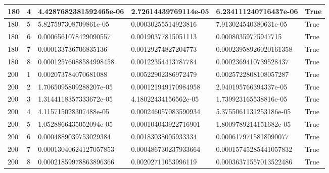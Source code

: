 \documentclass[a4paper, 12pt]{report}
\def\tabsize{4.4cm}
\def\stabsize{0.97cm}
\def\mtabsize{0.73cm}
\begin{document}
\begin{center}
\begin{longtable}{|m{\stabsize}|m{\stabsize}|m{\tabsize}|m{\tabsize}|m{\tabsize}|m{\mtabsize}|}
180 & 4 & 4.4287682381592465e-06 & 2.72614439769114e-05 & 6.234111240716437e-06 & True \\ \hline  
180 & 5 & 5.827597308709861e-05 & 0.00030255514923816 & 7.913024540380631e-05 & True \\ \hline  
180 & 6 & 0.0006561078429090557 & 0.00190377815051113 & 0.00080359775947715 & True \\ \hline  
180 & 7 & 0.000133736706835136 & 0.00129274827204773 & 0.00023958926020161358 & True \\ \hline  
180 & 8 & 0.00012576088584998458 & 0.00122354413787784 & 0.0002369410739528437 & True \\ \hline  
200 & 1 & 0.002073784070681088 & 0.00522902386972479 & 0.0025722808108057287 & True \\ \hline  
200 & 2 & 1.7065095809288207e-05 & 0.000121949170984958 & 2.940195766394337e-05 & True \\ \hline  
200 & 3 & 1.3144118357333672e-05 & 4.18022434156562e-05 & 1.739923165538816e-05 & True \\ \hline  
200 & 4 & 4.115715028307488e-05 & 0.000246057083590934 & 5.3755061131253186e-05 & True \\ \hline  
200 & 5 & 1.0528866435052094e-05 & 0.000104043922716901 & 1.8009789214151682e-05 & True \\ \hline  
200 & 6 & 0.0004889039753029384 & 0.00183038005933334 & 0.0006179715818090077 & True \\ \hline  
200 & 7 & 0.00013040624127057853 & 0.000486730237933664 & 0.00015745285441057832 & True \\ \hline  
200 & 8 & 0.00021859978863896366 & 0.00202711053996119 & 0.00036371557013522486 & True \\ \hline



\end{longtable}
\end{center}
\end{document}
